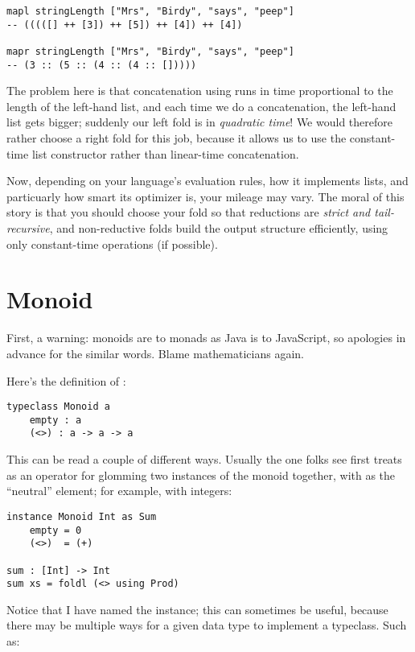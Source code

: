 \begin{lstlisting}[language=pseudoml]
mapl stringLength ["Mrs", "Birdy", "says", "peep"]
-- (((([] ++ [3]) ++ [5]) ++ [4]) ++ [4])

mapr stringLength ["Mrs", "Birdy", "says", "peep"]
-- (3 :: (5 :: (4 :: (4 :: []))))
\end{lstlisting}

The problem here is that concatenation using \mlil{++} runs in time proportional to the length of the left-hand list, and each time we do a concatenation, the left-hand list gets bigger; suddenly our left fold is in \emph{quadratic time}! We would therefore rather choose a right fold for this job, because it allows us to use the constant-time list constructor \mlil{::} rather than linear-time concatenation.

Now, depending on your language's evaluation rules, how it implements lists, and particuarly how smart its optimizer is, your mileage may vary. The moral of this story is that you should choose your fold so that reductions are \emph{strict and tail-recursive}, and non-reductive folds build the output structure efficiently, using only constant-time operations (if possible).

\section{Monoid}

First, a warning: monoids are to monads as Java is to JavaScript, so apologies in advance for the similar words. Blame mathematicians again.

Here's the definition of :

\begin{lstlisting}[language=pseudoml]
typeclass Monoid a
    empty : a
    (<>) : a -> a -> a
\end{lstlisting}

This can be read a couple of different ways. Usually the one folks see first treats \mlil{<>} as an operator for glomming two instances of the monoid together, with  as the ``neutral'' element; for example, with integers:

\begin{lstlisting}[language=pseudoml]
instance Monoid Int as Sum
    empty = 0
    (<>)  = (+)

sum : [Int] -> Int
sum xs = foldl (<> using Prod)
\end{lstlisting}

Notice that I have named the instance; this can sometimes be useful, because there may be multiple ways for a given data type to implement a typeclass. Such as:

